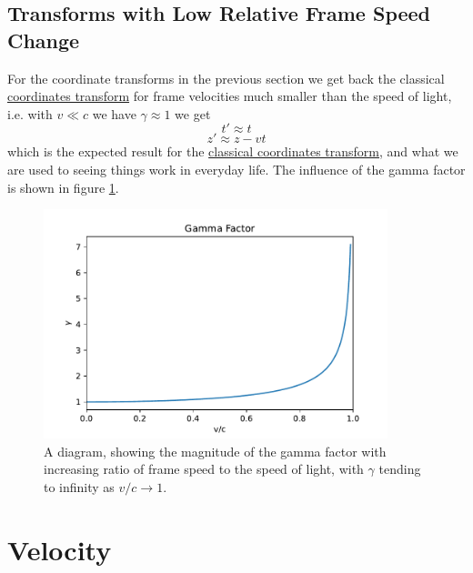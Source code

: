 \subsection{Transforms with Low Relative Frame Speed Change}
For the coordinate transforms in the previous section we get back the classical \hyperlink{def-galilean-transform}{coordinates transform} for frame velocities much smaller than the speed of light, i.e. with $v\ll c$ we have $\gamma \approx 1$ we get
\begin{equation}%
	t' \approx t
\end{equation}%
\begin{equation}%
	z' \approx z - vt
\end{equation}%
which is the expected result for the \hyperlink{def-galilean-transform}{classical coordinates transform}, and what we are used to seeing things work in everyday life. The influence of the gamma factor is shown in figure \ref{fig: Gamma Factor}.

\begin{figure}[H]
	\centering
	\includegraphics[width=10cm]{images/pdf/Gamma_Factor.pdf}
	\caption{A diagram, showing the magnitude of the gamma factor with increasing ratio of frame speed to the speed of light, with $\gamma$ tending to infinity as $v/c\rightarrow 1$.}
	\label{fig: Gamma Factor}
\end{figure}


\section{Velocity}

